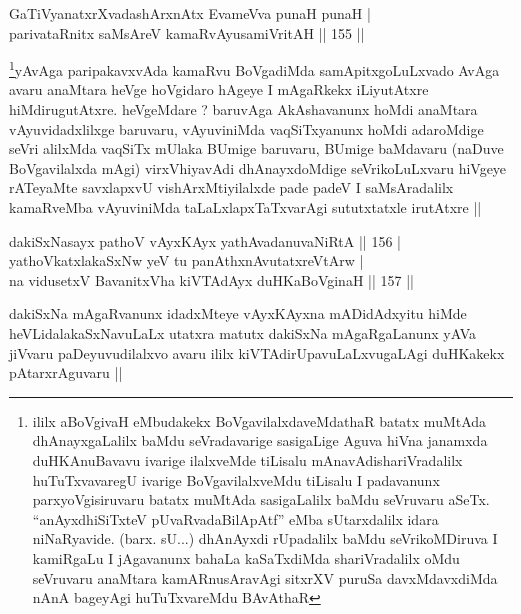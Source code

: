 \begin{shl}
GaTiVyanatxrXvadashArxnAtx EvameVva punaH punaH | \\
parivataRnitx saMsAreV kamaRvAyusamiVritAH \hfill|| 155 || 
\end{shl}

\begin{artha}
\footnote{ililx aBoVgivaH eMbudakekx BoVgavilalxdaveMdathaR batatx
  muMtAda dhAnayxgaLalilx baMdu seVradavarige sasigaLige Aguva hiVna
  janamxda duHKAnuBavavu ivarige ilalxveMde tiLisalu
  mAnavAdishariVradalilx huTuTxvavaregU ivarige BoVgavilalxveMdu
  tiLisalu I padavanunx parxyoVgisiruvaru batatx muMtAda sasigaLalilx
  baMdu seVruvaru aSeTx. ``anAyxdhiSiTxteV pUvaRvadaBilApAtf'' eMba
  sUtarxdalilx idara niNaRyavide. (barx. sU...) dhAnAyxdi rUpadalilx
  baMdu seVrikoMDiruva I kamiRgaLu I jAgavanunx bahaLa kaSaTxdiMda
  shariVradalilx oMdu seVruvaru anaMtara kamARnusAravAgi sitxrXV
  puruSa davxMdavxdiMda nAnA bageyAgi huTuTxvareMdu BAvAthaR}yAvAga paripakavxvAda kamaRvu BoVgadiMda samApitxgoLuLxvado
AvAga avaru anaMtara heVge hoVgidaro hAgeye I mAgaRkekx iLiyutAtxre
hiMdirugutAtxre. heVgeMdare ? baruvAga AkAshavanunx hoMdi anaMtara
vAyuvidadxlilxge baruvaru, vAyuviniMda vaqSiTxyanunx hoMdi adaroMdige
seVri alilxMda vaqSiTx mUlaka BUmige baruvaru, BUmige baMdavaru (naDuve
BoVgavilalxda mAgi) virxVhiyavAdi dhAnayxdoMdige seVrikoLuLxvaru
hiVgeye rATeyaMte savxlapxvU vishArxMtiyilalxde pade padeV I
saMsAradalilx kamaRveMba vAyuviniMda taLaLxlapxTaTxvarAgi sututxtatxle
irutAtxre ||
\end{artha}


\begin{shl}
dakiSxNasayx pathoV vAyxKAyx yathAvadanuvaNiRtA \hfill|| 156 | \\
yathoVkatxlakaSxNw yeV tu panAthxnAvutatxreVtArw | \\
na vidusetxV BavanitxVha kiVTAdAyx duHKaBoVginaH \hfill|| 157 || 
\end{shl}

\begin{artha}
dakiSxNa mAgaRvanunx idadxMteye vAyxKAyxna mADidAdxyitu hiMde
heVLidalakaSxNavuLaLx utatxra matutx dakiSxNa mAgaRgaLanunx yAVa
jiVvaru paDeyuvudilalxvo avaru ililx kiVTAdirUpavuLaLxvugaLAgi
duHKakekx pAtarxrAguvaru ||
\end{artha}


